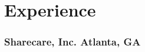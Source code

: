 \newcommand{\headerrow}[3] {
\item[] #1 \hfill #3}
%
\newenvironment{position}{
  \begin{itemize}[leftmargin=*]
    \setlength{\itemsep}{1pt}
    \setlength{\parskip}{0pt}
    \setlength{\parsep}{0pt}
}{\end{itemize}}

\section{Experience}

\subsubsection{Sharecare, Inc. Atlanta, GA}

